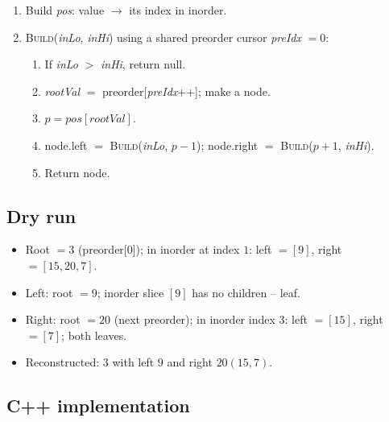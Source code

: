 \begin{enumerate}
  \item Build \textit{pos}: value $\to$ its index in inorder.
  \item \textsc{Build}(\textit{inLo}, \textit{inHi}) using a shared
        preorder cursor \textit{preIdx} $=0$:
  \begin{enumerate}
    \item If \textit{inLo} $>$ \textit{inHi}, return null.
    \item \textit{rootVal} $=$ preorder[\textit{preIdx}++]; make a node.
    \item $p=\textit{pos}[\textit{rootVal}]$.
    \item node.left $=$ \textsc{Build}(\textit{inLo}, $p-1$); node.right
          $=$ \textsc{Build}($p+1$, \textit{inHi}).
    \item Return node.
  \end{enumerate}
\end{enumerate}

\subsection*{Dry run}


\begin{itemize}
  \item Root $=3$ (preorder[0]); in inorder at index $1$: left $=[9]$,
        right $=[15,20,7]$.
  \item Left: root $=9$; inorder slice $[9]$ has no children -- leaf.
  \item Right: root $=20$ (next preorder); in inorder index $3$: left
        $=[15]$, right $=[7]$; both leaves.
  \item Reconstructed: $3$ with left $9$ and right $20(15,7)$.
\end{itemize}

\subsection*{C++ implementation}

